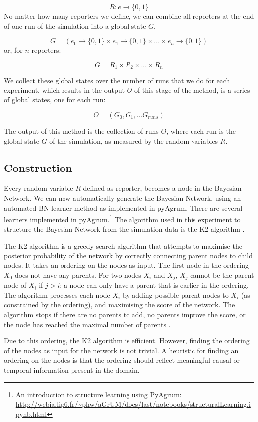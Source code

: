 \documentclass[12pt]{article}
\begin{document}
\[ R : e \rightarrow \{0, 1\} \]
No matter how many reporters we define, we can combine all reporters at the end of one run of the simulation into a global state $G$.

\[ G = (e_0 \rightarrow \{0, 1\} \times e_1 \rightarrow \{0, 1\} \times ... \times e_n \rightarrow \{0, 1\})\]
 or, for $n$ reporters:
 
\[ G = R_1 \times R_2 \times... \times R_n\]

We collect these global states over the number of runs that we do for each experiment, which results in the output $O$ of this stage of the method, is a series of global states, one for each run:

\[ O = (G_0, G_1, ... G_{runs})\]

The output of this method is the collection of runs $O$, where each run is the global state $G$ of the simulation, as measured by the random variables $R$.

\subsection{Construction}
Every random variable $R$ defined as reporter, becomes a node in the Bayesian Network. We can now automatically generate the Bayesian Network, using an automated BN learner method as implemented in pyAgrum. There are several learners implemented in pyAgrum.\footnote{An introduction to structure learning using PyAgrum: \url{http://webia.lip6.fr/~phw/aGrUM/docs/last/notebooks/structuralLearning.ipynb.html}} The algorithm used in this experiment to structure the Bayesian Network from the simulation data is the K2 algorithm \citep{Cooper1992}. 

The K2 algorithm is a greedy search algorithm that attempts to maximise the posterior probability of the network by correctly connecting parent nodes to child nodes. It takes an ordering on the nodes as input. The first node in the ordering $X_0$ does not have any parents. For two nodes $X_i$ and $X_j$, $X_j$ cannot be the parent node of $X_i$ if $j > i$: a node can only have a parent that is earlier in the ordering. The algorithm processes each node $X_i$ by adding possible parent nodes to $X_i$ (as constrained by the ordering), and maximising the score of the network. The algorithm stops if there are no parents to add, no parents improve the score, or the node has reached the maximal number of parents \citep{Chen2008}.

Due to this ordering, the K2 algorithm is efficient. However, finding the ordering of the nodes as input for the network is not trivial.  A heuristic for finding an ordering on the nodes is that the ordering should reflect meaningful causal or temporal information present in the domain. 
\end{document}
